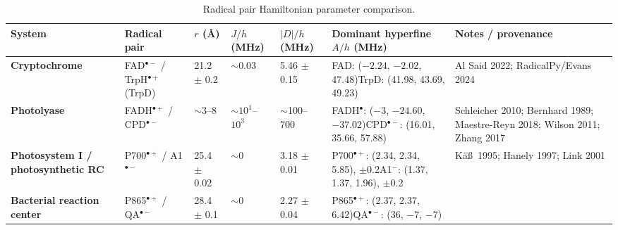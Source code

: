 \documentclass[12pt]{article}
\begin{document}
\clearpage
\begin{landscape}
\begin{table}[p]
    \centering
    \caption{Radical pair Hamiltonian parameter comparison.}
    \label{tab:radical-pair-hamiltonian-comparison}
    \scriptsize
    \setlength{\tabcolsep}{4pt}
    \renewcommand{\arraystretch}{1.18}
    \begin{tabular}{|L{1.00in}|L{1.25in}|C{0.70in}|C{0.75in}|C{0.90in}|L{1.70in}|L{1.85in}|}
        \hline
        \textbf{System} & \textbf{Radical pair} & \textbf{$r$ (\AA)} & \textbf{$J/h$ (MHz)} & \textbf{$\lvert D\rvert/h$ (MHz)} & \textbf{Dominant hyperfine $A/h$ (MHz)} & \textbf{Notes / provenance} \\
        \hline
        \textbf{Cryptochrome} & FAD$^{\bullet-}$ / TrpH$^{\bullet+}$ (TrpD) &
        21.2 $\pm$ 0.2 &
        $\sim$0.03 &
        5.46 $\pm$ 0.15 &
        FAD: ($-2.24$, $-2.02$, 47.48)\newline TrpD: (41.98, 43.69, 49.23) &
        Al Said 2022; RadicalPy/Evans 2024 \\
        \hline
        \textbf{Photolyase} & FADH$^{\bullet+}$ / CPD$^{\bullet-}$ &
        \color{white}$\sim$3--8 &
        $\sim 10^{1}$--$10^{3}$ &
        $\sim$100--700 &
        FADH$^{\bullet}$: ($-3$, $-24.60$, $-37.02$)\newline CPD$^{\bullet-}$: (16.01, 35.66, 57.88) &
        Schleicher 2010; Bernhard 1989; Maestre-Reyn 2018; Wilson 2011; Zhang 2017 \\
        \hline
        \textbf{Photosystem I / photosynthetic RC} & P700$^{\bullet+}$ / A1$^{\bullet-}$ &
        25.4 $\pm$ 0.02 &
        $\sim$0 &
        3.18 $\pm$ 0.01 &
        P700$^{\bullet+}$: (2.34, 2.34, 5.85), $\pm$0.2\newline A1$^{-}$: (1.37, 1.37, 1.96), $\pm$0.2 &
        K\"a\ss\ 1995; Hanely 1997; Link 2001 \\
        \hline
        \textbf{Bacterial reaction center} & P865$^{\bullet+}$ / QA$^{\bullet-}$ &
        28.4 $\pm$ 0.1 &
        $\sim$0 &
        2.27 $\pm$ 0.04 &
        P865$^{\bullet+}$: (2.37, 2.37, 6.42)\newline QA$^{\bullet-}$: (36, $-7$, $-7$) &

\end{tabular}
\end{table}
\end{landscape}
\end{document}
